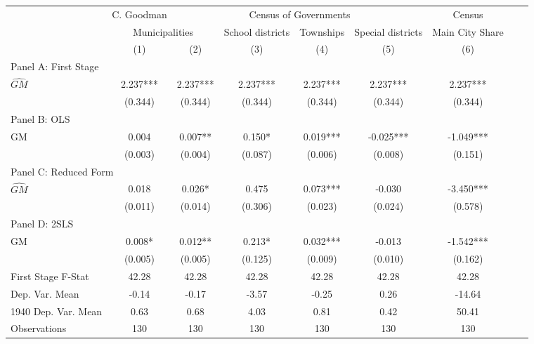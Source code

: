  \begin{tabular}{l*{8}{c}} \toprule
&\multicolumn{1}{c}{C. Goodman}&\multicolumn{4}{c}{Census of Governments}&\multicolumn{1}{c}{Census}\\\cmidrule(lr){2-2}\cmidrule(lr){3-6}\cmidrule(lr){7-7}
&\multicolumn{2}{c}{Municipalities}&\multicolumn{1}{c}{School districts}&\multicolumn{1}{c}{Townships}&\multicolumn{1}{c}{Special districts}&\multicolumn{1}{c}{Main City Share}\\\cmidrule(lr){2-3}\cmidrule(lr){4-6}\cmidrule(lr){7-7}
&\multicolumn{1}{c}{(1)}&\multicolumn{1}{c}{(2)}&\multicolumn{1}{c}{(3)}&\multicolumn{1}{c}{(4)}&\multicolumn{1}{c}{(5)}&\multicolumn{1}{c}{(6)}\\
\cmidrule(lr){1-7}
\multicolumn{6}{l}{Panel A: First Stage}\\
\cmidrule(lr){1-7}
$\widehat{GM}$  &    2.237***&    2.237***&    2.237***&    2.237***&    2.237***&    2.237***\\
                &  (0.344)   &  (0.344)   &  (0.344)   &  (0.344)   &  (0.344)   &  (0.344)   \\
\cmidrule(lr){1-7}
\multicolumn{6}{l}{Panel B: OLS}\\
\cmidrule(lr){1-7}
GM              &    0.004   &    0.007** &    0.150*  &    0.019***&   -0.025***&   -1.049***\\
                &  (0.003)   &  (0.004)   &  (0.087)   &  (0.006)   &  (0.008)   &  (0.151)   \\
\cmidrule(lr){1-7}
\multicolumn{6}{l}{Panel C: Reduced Form}\\
\cmidrule(lr){1-7}
$\widehat{GM}$  &    0.018   &    0.026*  &    0.475   &    0.073***&   -0.030   &   -3.450***\\
                &  (0.011)   &  (0.014)   &  (0.306)   &  (0.023)   &  (0.024)   &  (0.578)   \\
\cmidrule(lr){1-7}
\multicolumn{6}{l}{Panel D: 2SLS}\\
\cmidrule(lr){1-7}
GM              &    0.008*  &    0.012** &    0.213*  &    0.032***&   -0.013   &   -1.542***\\
                &  (0.005)   &  (0.005)   &  (0.125)   &  (0.009)   &  (0.010)   &  (0.162)   \\
\midrule
First Stage F-Stat&    42.28   &    42.28   &    42.28   &    42.28   &    42.28   &    42.28   \\
Dep. Var. Mean  &    -0.14   &    -0.17   &    -3.57   &    -0.25   &     0.26   &   -14.64   \\
1940 Dep. Var. Mean&     0.63   &     0.68   &     4.03   &     0.81   &     0.42   &    50.41   \\
Observations    &      130   &      130   &      130   &      130   &      130   &      130   \\
       \bottomrule \end{tabular}

